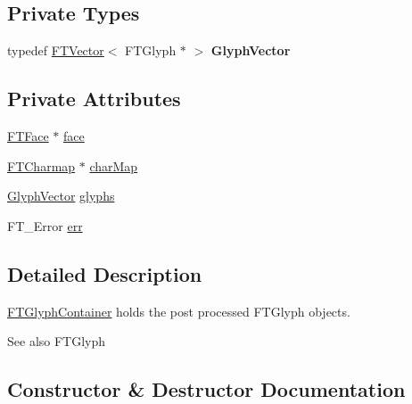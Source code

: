 \subsection*{Private Types}
\begin{DoxyCompactItemize}
\item 
typedef \hyperlink{class_f_t_vector}{F\+T\+Vector}$<$ F\+T\+Glyph $\ast$ $>$ {\bfseries Glyph\+Vector}\hypertarget{class_f_t_glyph_container_a0123dd973d8e6ecb06d4fa4ea3e6c88b}{}\label{class_f_t_glyph_container_a0123dd973d8e6ecb06d4fa4ea3e6c88b}

\end{DoxyCompactItemize}
\subsection*{Private Attributes}
\begin{DoxyCompactItemize}
\item 
\hyperlink{class_f_t_face}{F\+T\+Face} $\ast$ \hyperlink{class_f_t_glyph_container_afd28a78efbafe6f45e07766f538be143}{face}
\item 
\hyperlink{class_f_t_charmap}{F\+T\+Charmap} $\ast$ \hyperlink{class_f_t_glyph_container_a54d2436f2ee8a29e923e06152689c38e}{char\+Map}
\item 
\hyperlink{class_f_t_vector}{Glyph\+Vector} \hyperlink{class_f_t_glyph_container_aeb09744c501786064b97a982247e78ff}{glyphs}
\item 
F\+T\+\_\+\+Error \hyperlink{class_f_t_glyph_container_a090090b898be4cf4301e6c098429cead}{err}
\end{DoxyCompactItemize}


\subsection{Detailed Description}
\hyperlink{class_f_t_glyph_container}{F\+T\+Glyph\+Container} holds the post processed F\+T\+Glyph objects.

\begin{DoxySeeAlso}{See also}
F\+T\+Glyph 
\end{DoxySeeAlso}


\subsection{Constructor \& Destructor Documentation}
